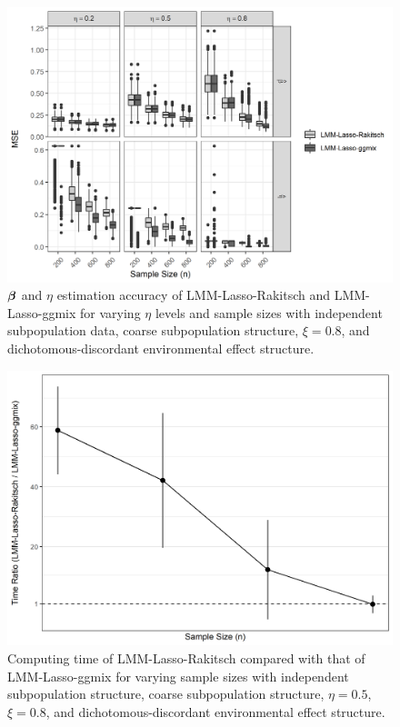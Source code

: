 \begin{figure}[H]
    \centering
    \includegraphics[scale = 1]{figures/eta_beta_hat.png}
     \caption{$\boldsymbol{\beta}{}$ and $\eta$ estimation accuracy of LMM-Lasso-Rakitsch and LMM-Lasso-ggmix for varying $\eta$ levels and sample sizes with independent subpopulation data, coarse subpopulation structure, $\xi = 0.8$, and dichotomous-discordant environmental effect structure.}
    \label{fig:eta_beta_mse}
\end{figure}


\begin{figure}[H]
    \centering
    \includegraphics[scale = 0.8]{figures/time_ratio.png}
    \caption{Computing time of LMM-Lasso-Rakitsch compared with that of LMM-Lasso-ggmix for varying sample sizes with independent subpopulation structure, coarse subpopulation structure, $\eta = 0.5$, $\xi = 0.8$, and dichotomous-discordant environmental effect structure.}
    \label{fig:time}
\end{figure}

